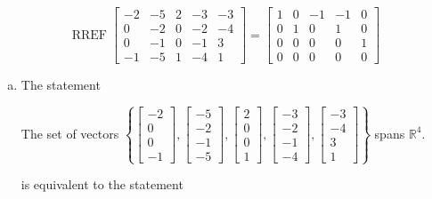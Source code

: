 \begin{exerciseAnswer} 


\[\operatorname{RREF} \left[\begin{array}{ccccc}
-2 & -5 & 2 & -3 & -3 \\
0 & -2 & 0 & -2 & -4 \\
0 & -1 & 0 & -1 & 3 \\
-1 & -5 & 1 & -4 & 1
\end{array}\right] = \left[\begin{array}{ccccc}
1 & 0 & -1 & -1 & 0 \\
0 & 1 & 0 & 1 & 0 \\
0 & 0 & 0 & 0 & 1 \\
0 & 0 & 0 & 0 & 0
\end{array}\right] \]


\begin{enumerate}[(a)]
\item The statement 
\begin{center}\begin{minipage}{0.8\textwidth}
 The set of vectors \( \left\{ \left[\begin{array}{c}
-2 \\
0 \\
0 \\
-1
\end{array}\right] , \left[\begin{array}{c}
-5 \\
-2 \\
-1 \\
-5
\end{array}\right] , \left[\begin{array}{c}
2 \\
0 \\
0 \\
1
\end{array}\right] , \left[\begin{array}{c}
-3 \\
-2 \\
-1 \\
-4
\end{array}\right] , \left[\begin{array}{c}
-3 \\
-4 \\
3 \\
1
\end{array}\right] \right\} \) spans \(\mathbb{R}^4\). 
\end{minipage}\end{center}
     is equivalent to the statement 

\end{enumerate}
\end{exerciseAnswer}
